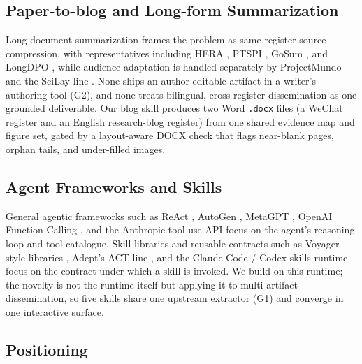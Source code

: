 \documentclass{article}
\begin{document}
\subsection{Paper-to-blog and Long-form Summarization}\label{sec:rw-blog}

Long-document summarization frames the problem as same-register source compression, with representatives including HERA \citep{hera2025}, PTSPI \citep{ptspi2025}, GoSum \citep{gosum2024}, and LongDPO \citep{longdpo2025}, while audience adaptation is handled separately by ProjectMundo \citep{projectmundo2025} and the SciLay line \citep{scilay2025}. None ships an author-editable artifact in a writer's authoring tool (G2), and none treats bilingual, cross-register dissemination as one grounded deliverable. Our blog skill produces two Word \texttt{.docx} files (a WeChat register and an English research-blog register) from one shared evidence map and figure set, gated by a layout-aware DOCX check that flags near-blank pages, orphan tails, and under-filled images.

\subsection{Agent Frameworks and Skills}\label{sec:rw-agents}

General agentic frameworks such as ReAct \citep{react2023}, AutoGen \citep{autogen2023}, MetaGPT \citep{metagpt2024}, OpenAI Function-Calling \citep{openai2023functions}, and the Anthropic tool-use API \citep{anthropic2024toolUse} focus on the agent's reasoning loop and tool catalogue. Skill libraries and reusable contracts such as Voyager-style libraries \citep{voyager2024}, Adept's ACT line \citep{adept2023act}, and the Claude Code \citep{anthropic2025claudecode} / Codex \citep{openai2025codex} skills runtime \citep{anthropic2025skills} focus on the contract under which a skill is invoked. We build on this runtime; the novelty is not the runtime itself but applying it to multi-artifact dissemination, so five skills share one upstream extractor (G1) and converge in one interactive surface.

\subsection{Positioning}\label{sec:rw-positioning}
\end{document}
